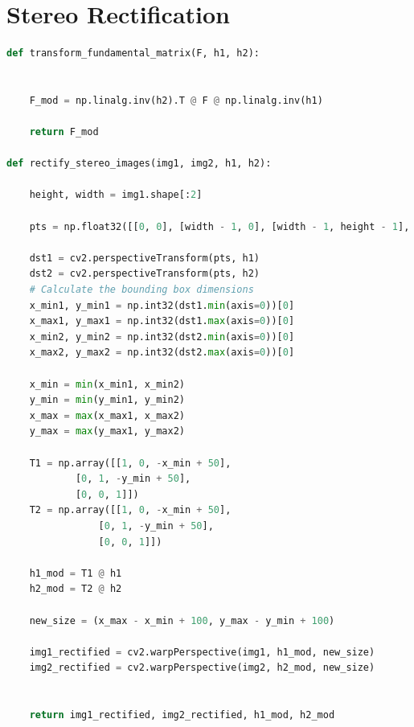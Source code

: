 \section*{Stereo Rectification}
\begin{lstlisting}[language=python]
def transform_fundamental_matrix(F, h1, h2):
    
    
    F_mod = np.linalg.inv(h2).T @ F @ np.linalg.inv(h1)
    
    return F_mod

def rectify_stereo_images(img1, img2, h1, h2):
    
    height, width = img1.shape[:2]
        
    pts = np.float32([[0, 0], [width - 1, 0], [width - 1, height - 1], [0, height - 1]]).reshape(-1, 1, 2)

    dst1 = cv2.perspectiveTransform(pts, h1)
    dst2 = cv2.perspectiveTransform(pts, h2)
    # Calculate the bounding box dimensions
    x_min1, y_min1 = np.int32(dst1.min(axis=0))[0]
    x_max1, y_max1 = np.int32(dst1.max(axis=0))[0]
    x_min2, y_min2 = np.int32(dst2.min(axis=0))[0]
    x_max2, y_max2 = np.int32(dst2.max(axis=0))[0]

    x_min = min(x_min1, x_min2)
    y_min = min(y_min1, y_min2)
    x_max = max(x_max1, x_max2)
    y_max = max(y_max1, y_max2)

    T1 = np.array([[1, 0, -x_min + 50],
            [0, 1, -y_min + 50],
            [0, 0, 1]])
    T2 = np.array([[1, 0, -x_min + 50],
                [0, 1, -y_min + 50],
                [0, 0, 1]])

    h1_mod = T1 @ h1
    h2_mod = T2 @ h2

    new_size = (x_max - x_min + 100, y_max - y_min + 100)

    img1_rectified = cv2.warpPerspective(img1, h1_mod, new_size)
    img2_rectified = cv2.warpPerspective(img2, h2_mod, new_size)


    return img1_rectified, img2_rectified, h1_mod, h2_mod
\end{lstlisting}
